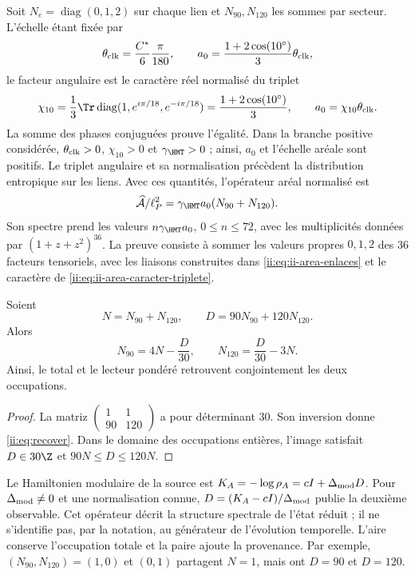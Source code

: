 Soit $N_e=\operatorname{diag}(0,1,2)$ sur chaque lien et
$N_{90},N_{120}$ les sommes par secteur. L'échelle étant fixée par
\[
\theta_{\rm clk}=\frac{C^*}{6}\frac{\pi}{180},\qquad
a_0=\frac{1+2\cos(10^\circ)}3\theta_{\rm clk},
\]
le facteur angulaire est le caractère réel normalisé du triplet
\begin{equation}
 \chi_{10}=\frac13\Tr\operatorname{diag}
       (1,e^{i\pi/18},e^{-i\pi/18})
 =\frac{1+2\cos(10^\circ)}3,
 \qquad a_0=\chi_{10}\theta_{\rm clk}.
 \label{ii:eq:ii-area-caracter-triplete}
\end{equation}
La somme des phases conjuguées prouve l'égalité. Dans la branche positive
considérée, \(\theta_{\rm clk}>0\), \(\chi_{10}>0\) et
\(\gamma_{\HMT}>0\) ; ainsi, \(a_0\) et l'échelle aréale sont
positifs. Le triplet angulaire et sa normalisation précèdent la
distribution entropique sur les liens. Avec ces quantités,
l'opérateur aréal normalisé est
\[
\widehat{\mathcal A}/\ell_P^2
=\gamma_{\HMT}a_0(N_{90}+N_{120}).
\]
Son spectre prend les valeurs $n\gamma_{\HMT}a_0$, $0\le n\le72$,
avec les multiplicités données par $(1+z+z^2)^{36}$.
La preuve consiste à sommer les valeurs propres $0,1,2$ des
36 facteurs tensoriels, avec les liaisons construites dans \eqref{ii:eq:ii-area-enlaces} et le caractère de \eqref{ii:eq:ii-area-caracter-triplete}.

\begin{theorem}
Soient
\[
N=N_{90}+N_{120},\qquad D=90N_{90}+120N_{120}.
\]
Alors
\begin{equation}
N_{90}=4N-\frac D{30},\qquad
N_{120}=\frac D{30}-3N.
\label{ii:eq:recover}
\end{equation}
Ainsi, le total et le lecteur pondéré retrouvent conjointement
les deux occupations.
\end{theorem}
\begin{proof}
La matriz $\left(\begin{smallmatrix}1&1\\90&120\end{smallmatrix}\right)$
a pour déterminant $30$. Son inversion donne \eqref{ii:eq:recover}.
Dans le domaine des occupations entières, l'image satisfait
$D\in30\Z$ et $90N\le D\le120N$.
\end{proof}

Le Hamiltonien modulaire de la source est
$K_A=-\log\rho_A=cI+\Delta_{\rm mod}D$.
Pour $\Delta_{\rm mod}\ne0$ et une normalisation connue,
$D=(K_A-cI)/\Delta_{\rm mod}$ publie la deuxième observable.
Cet opérateur décrit la structure spectrale de l'état réduit ;
il ne s'identifie pas, par la notation, au générateur de l'évolution temporelle.
L'aire conserve l'occupation totale et la paire ajoute la provenance.
Par exemple, $(N_{90},N_{120})=(1,0)$ et $(0,1)$ partagent $N=1$,
mais ont $D=90$ et $D=120$.


